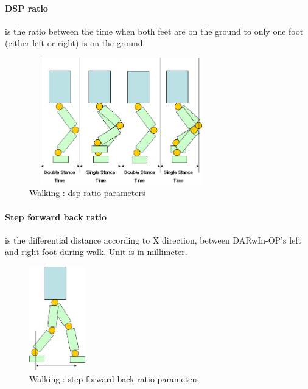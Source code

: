 \documentclass[a4paper, 12pt]{article}  		%
\begin{document}
\paragraph*{DSP ratio}
is the ratio between the time when both feet are on the ground to only one foot (either left or right) is on the ground.
\begin{figure}[H]
\begin{center}
\includegraphics[width=8cm, height=5.5cm]{dsp_ratio.jpg}
\caption{Walking : dsp ratio parameters}
\label{dsp_ratio}
\end{center}
\end{figure}

\newpage
\paragraph*{Step forward back ratio}
is the differential distance according to X direction, between DARwIn-OP's left and right foot during walk. Unit is in millimeter.
\begin{figure}[H]
\begin{center}
\includegraphics[height=4.5cm]{step_forward_back_ratio.jpg}
\caption{Walking : step forward back ratio parameters}
\label{step_forward_back_ratio}
\end{center}
\end{figure}
\end{document}

